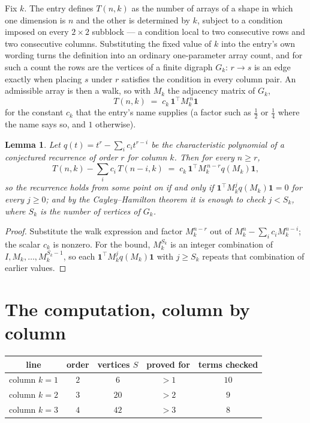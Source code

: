\documentclass[11pt,a4paper]{article}
\theoremstyle{plain}
\newtheorem{lemma}[theorem]{Lemma}
\theoremstyle{definition}
\begin{document}
Fix $k$. The entry defines $T(n,k)$ as the number of arrays of a shape in which one dimension
is $n$ and the other is determined by $k$, subject to a condition imposed on every
$2\times2$ subblock --- a condition local to two consecutive rows and two consecutive columns.
Substituting the fixed value of $k$ into the entry's own wording turns the definition into an
ordinary one-parameter array count, and for such a count the rows are the vertices of a finite
digraph $G_k$: $r\to s$ is an edge exactly when placing $s$ under $r$ satisfies the condition
in every column pair. An admissible array is then a walk, so with $M_k$ the adjacency matrix
of $G_k$,
\[
T(n,k)\;=\;c_k\,\mathbf{1}^{\!\top}M_k^{\,n}\mathbf{1}
\]
for the constant $c_k$ that the entry's name supplies (a factor such as $\tfrac12$ or
$\tfrac14$ where the name says so, and $1$ otherwise).

\begin{lemma}\label{lem:crit}
Let $q(t)=t^{r}-\sum_i c_it^{r-i}$ be the characteristic polynomial of a conjectured
recurrence of order $r$ for column $k$. Then for every $n\ge r$,
\[
T(n,k)-\sum_i c_i\,T(n-i,k)\;=\;c_k\,\mathbf{1}^{\!\top}M_k^{\,n-r}q(M_k)\mathbf{1},
\]
so the recurrence holds from some point on if and only if
$\mathbf{1}^{\!\top}M_k^{j}q(M_k)\mathbf{1}=0$ for every $j\ge0$; and by the
Cayley--Hamilton theorem it is enough to check $j<S_k$, where $S_k$ is the number of vertices
of $G_k$.
\end{lemma}

\begin{proof}
Substitute the walk expression and factor $M_k^{n-r}$ out of $M_k^{n}-\sum_ic_iM_k^{n-i}$;
the scalar $c_k$ is nonzero. For the bound, $M_k^{S_k}$ is an integer combination of
$I,M_k,\dots,M_k^{S_k-1}$, so each $\mathbf{1}^{\!\top}M_k^{j}q(M_k)\mathbf{1}$ with
$j\ge S_k$ repeats that combination of earlier values.
\end{proof}

\section{The computation, column by column}

\begin{center}
\begin{tabular}{ccccc}
line & order & vertices $S$ & proved for & terms checked \\ \hline
column $k$$=1$ & $2$ & $6$ & $>1$ & $10$ \\
column $k$$=2$ & $3$ & $20$ & $>2$ & $9$ \\
column $k$$=3$ & $4$ & $42$ & $>3$ & $8$ \\
\end{tabular}
\end{center}
\end{document}
